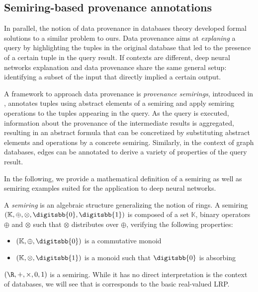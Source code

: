 \documentclass{../cs-classes/cs-classes}
\newcommand*{\K}{\mathbb{K}}
\newcommand*{\1}{\digitsbb{1}}
\newcommand*{\0}{\digitsbb{0}}
\begin{document}

\subsection{Semiring-based provenance annotations}
In parallel, the notion of data provenance in databases theory developed formal solutions to a similar problem to ours. Data provenance aims at \emph{explaning} a query by highlighting the tuples in the original database that led to the presence of a certain tuple in the query result. If contexts are different, deep neural networks explanation and data provenance share the same general setup: identifying a subset of the input that directly implied a certain output.

A framework to approach data provenance is \emph{provenance semirings}, introduced in \cite{green-2007}, annotates tuples using abstract elements of a semiring and apply semiring operations to the tuples appearing in the query. As the query is executed, information about the provenance of the intermediate results is aggregated, resulting in an abstract formula that can be concretized by substituting abstract elements and operations by a concrete semiring. Similarly, in the context of graph databases, edges can be annotated to derive a variety of properties of the query result. \cite{ramusat-prov}

In the following, we provide a mathematical definition of a semiring as well as semiring examples suited for the application to deep neural networks.

\begin{definition}[Semiring]
    A \emph{semiring} is an algebraic structure generalizing the notion of rings. A semiring $(\K, \oplus, \otimes, \0, \1)$ is composed of a set $\K$, binary operators $\oplus$ and $\otimes$ such that $\otimes$ distributes over $\oplus$, verifying the following properties:
    \begin{itemize}
        \item $(\K, \oplus, \0)$ is a commutative monoid
        \item $(\K, \otimes, \1)$ is a monoid such that $\0$ is absorbing
    \end{itemize}
\end{definition}

\begin{example}
    $(\R, +, \times, 0, 1)$ is a semiring. While it has no direct interpretation is the context of databases, we will see that is corresponds to the basic real-valued LRP.
\end{example}
\end{document}
